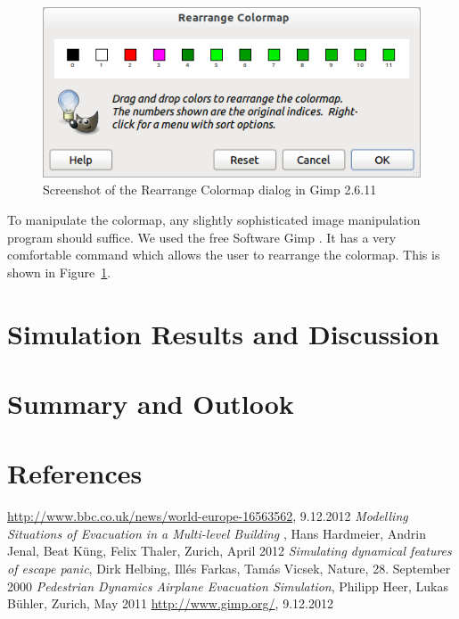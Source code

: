 \documentclass[11pt]{article}
\begin{document}
\begin{figure}[h]
	\centering
	\includegraphics[scale=0.5]{images/gimp.png}
	\caption{Screenshot of the Rearrange Colormap dialog in Gimp 2.6.11}
	\label{gimpscreenshot}
	
\end{figure}
To manipulate the colormap, any slightly sophisticated image manipulation program should suffice. We used the free Software Gimp \cite{gimp}. It has a very comfortable command which allows the user to rearrange the colormap. This is shown in Figure~\ref{gimpscreenshot}.

\section{Simulation Results and Discussion}

\section{Summary and Outlook}

\section{References}



\begingroup 
\renewcommand{\section}[2]{}%
\begin{thebibliography}{9}

		\url{http://www.bbc.co.uk/news/world-europe-16563562}, 9.12.2012
	\emph{Modelling Situations of Evacuation
in a Multi-level Building} , 
Hans Hardmeier, Andrin Jenal, Beat Küng, Felix Thaler, Zurich, April 2012
		\emph{Simulating dynamical features of escape panic},
		Dirk Helbing, Ill\'es Farkas, Tam\'as Vicsek, Nature, 28. September 2000
		\emph{Pedestrian Dynamics Airplane Evacuation Simulation},
		Philipp Heer, Lukas Bühler, Zurich, May 2011
		\url{http://www.gimp.org/}, 9.12.2012
\end{thebibliography}
\endgroup
\end{document}
